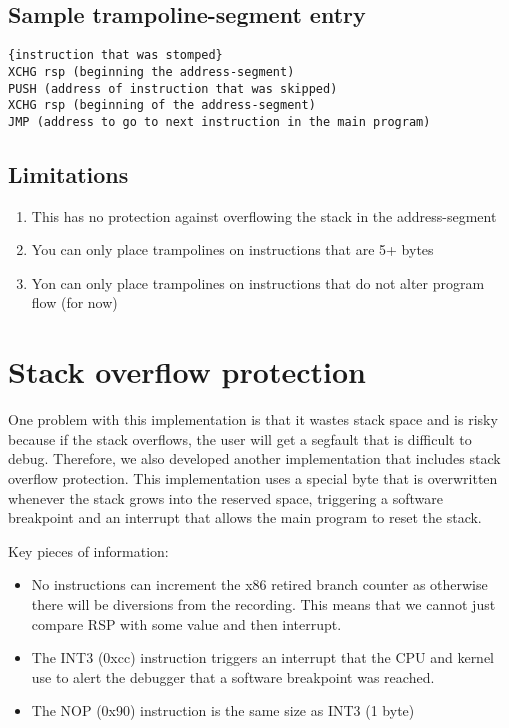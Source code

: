 \subsection{Sample trampoline-segment entry}
\begin{verbatim}
{instruction that was stomped}
XCHG rsp (beginning the address-segment)
PUSH (address of instruction that was skipped)
XCHG rsp (beginning of the address-segment)
JMP (address to go to next instruction in the main program)
\end{verbatim}

\subsection{Limitations}
\begin{enumerate}
    \item This has no protection against overflowing the stack in the address-segment
    \item You can only place trampolines on instructions that are 5+ bytes 
    \item Yon can only place trampolines on instructions that do not alter program flow (for now)
\end{enumerate}


\section{Stack overflow protection}
One problem with this implementation is that it wastes stack space and is risky because if the stack overflows, the user will get a segfault that is difficult to debug. Therefore, we also developed another implementation that includes stack overflow protection. This implementation uses a special byte that is overwritten whenever the stack grows into the reserved space, triggering a software breakpoint and an interrupt that allows the main program to reset the stack.

\noindent Key pieces of information:
\begin{itemize}
    \item No instructions can increment the x86 retired branch counter as otherwise there will be diversions from the recording. This means that we cannot just compare RSP with some value and then interrupt. 
    \item The INT3 (0xcc) instruction triggers an interrupt that the CPU and kernel use to alert the debugger that a software breakpoint was reached.
    \item The NOP (0x90) instruction is the same size as INT3 (1 byte) 
\end{itemize}
